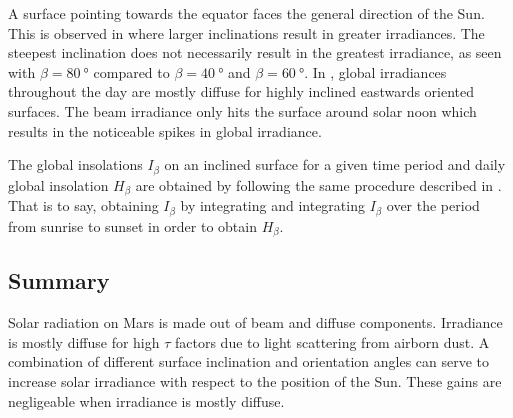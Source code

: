 A surface pointing towards the equator faces the general direction of the Sun. This is observed in  where larger inclinations result in greater irradiances. The steepest inclination does not necessarily result in the greatest irradiance, as seen with $\beta = \SI{80}{\degree}$ compared to $\beta = \SI{40}{\degree}$ and $\beta = \SI{60}{\degree}$. In , global irradiances throughout the day are mostly diffuse for highly inclined eastwards oriented surfaces. The beam irradiance only hits the surface around solar noon which results in the noticeable spikes in global irradiance.

The global insolations $I_{\beta}$ on an inclined surface for a given time period and daily global insolation $H_{\beta}$ are obtained by following the same procedure described in . That is to say, obtaining $I_{\beta}$ by integrating  and integrating $I_{\beta}$ over the period from sunrise to sunset in order to obtain $H_{\beta}$.


\subsection{Summary}
Solar radiation on Mars is made out of beam and diffuse components. Irradiance is mostly diffuse for high $\tau$ factors due to light scattering from airborn dust. A combination of different surface inclination and orientation angles can serve to increase solar irradiance with respect to the position of the Sun. These gains are negligeable when irradiance is mostly diffuse.



